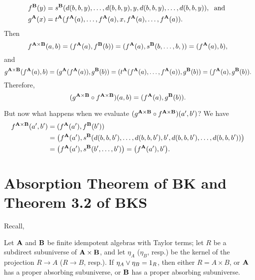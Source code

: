 \begin{align*}
  f^{\mathbf{B}}(y) &= s^{\mathbf{B}}(d(b,b,y), \dots, d(b,b,y), y, d(b,b,y), \dots, d(b,b,y)), \; \text{ and }\\
  g^{\mathbf{A}}(x) &= t^{\mathbf{A}}(f^{\mathbf{A}}(a), \dots, f^{\mathbf{A}}(a), x, f^{\mathbf{A}}(a), \dots, f^{\mathbf{A}}(a)).
\end{align*}
Then
\[
f^{\mathbf{A}\times \mathbf{B}} (a,b) =
(f^{\mathbf{A}} (a), f^{\mathbf{B}}(b)) = (f^{\mathbf{A}} (a), s^{\mathbf{B}}(b, \dots, b, )) = (f^{\mathbf{A}} (a), b),
\]
and 
\[
g^{\mathbf{A}\times \mathbf{B}} (f^{\mathbf{A}} (a), b) =
(g^{\mathbf{A}} (f^{\mathbf{A}} (a)), g^{\mathbf{B}}(b))=
(t^{\mathbf{A}}(f^{\mathbf{A}}(a), \dots, f^{\mathbf{A}}(a)),g^{\mathbf{B}}(b))=
(f^{\mathbf{A}} (a), g^{\mathbf{B}} (b)).
\]
Therefore,
\[
(g^{\mathbf{A}\times \mathbf{B}}\circ f^{\mathbf{A}\times \mathbf{B}}) (a,b) =
(f^{\mathbf{A}} (a), g^{\mathbf{B}} (b)).
\]

But now what happens when we evaluate 
$(g^{\mathbf{A}\times \mathbf{B}}\circ f^{\mathbf{A}\times \mathbf{B}}) (a',b')$?
We have
\begin{align*}
  f^{\mathbf{A}\times \mathbf{B}} (a',b') &=
  (f^{\mathbf{A}} (a'), f^{\mathbf{B}}(b')) \\&= \bigl(f^{\mathbf{A}} (a'), s^{\mathbf{B}}(d(b,b,b'), \dots,
  d(b,b,b'), b', d(b,b,b'),\dots, d(b,b,b'))\bigr)\\
  &= \bigl(f^{\mathbf{A}} (a'), s^{\mathbf{B}}(b', \dots, b')\bigr)= \bigl(f^{\mathbf{A}} (a'), b'\bigr).
\end{align*}


\section{Absorption Theorem of BK and Theorem 3.2 of BKS}
Recall,
\begin{theorem}
\label{thm:absorption}
Let $\mathbf{A}$ and $\mathbf{B}$ be finite
idempotent algebras with Taylor terms; let $R$ be a subdirect subuniverse of
$\mathbf{A} \times \mathbf{B}$, and let $\eta_A$ ($\eta_B$, resp.) be the kernel of the
projection $R \to A$ ($R \to B$, resp.).
If $\eta_A \vee \eta_B = 1_R$, then either $R = A \times B$, or
$\mathbf{A}$ has a proper absorbing subuniverse, or $\mathbf{B}$ has a proper absorbing subuniverse.
\end{theorem}


